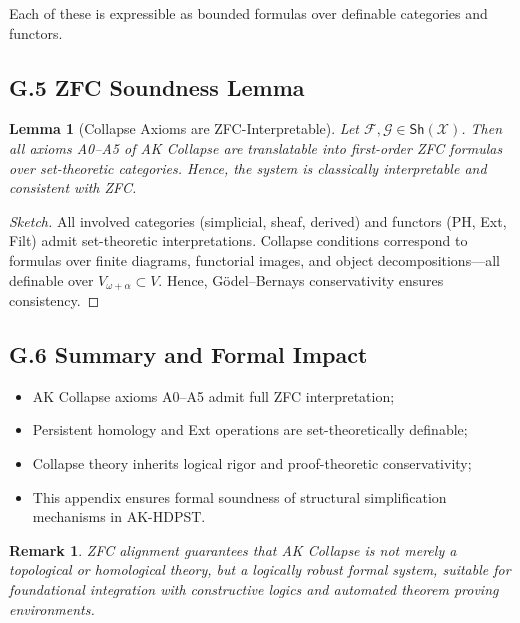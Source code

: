 \documentclass[11pt]{article}
\newtheorem{lemma}[theorem]{Lemma}
\newtheorem{remark}[theorem]{Remark}
\begin{document}
Each of these is expressible as bounded formulas over definable categories and functors.

\subsection*{G.5 ZFC Soundness Lemma}

\begin{lemma}[Collapse Axioms are ZFC-Interpretable]
Let \( \mathcal{F}, \mathcal{G} \in \mathsf{Sh}(\mathcal{X}) \). Then all axioms A0–A5 of AK Collapse  
are translatable into first-order ZFC formulas over set-theoretic categories.  
Hence, the system is classically interpretable and consistent with ZFC.
\end{lemma}

\begin{proof}[Sketch]
All involved categories (simplicial, sheaf, derived) and functors (PH, Ext, Filt) admit set-theoretic interpretations.  
Collapse conditions correspond to formulas over finite diagrams, functorial images, and object decompositions—all  
definable over \( V_{\omega + \alpha} \subset V \). Hence, Gödel–Bernays conservativity ensures consistency.
\end{proof}

\subsection*{G.6 Summary and Formal Impact}

\begin{itemize}
  \item AK Collapse axioms A0–A5 admit full ZFC interpretation;
  \item Persistent homology and Ext operations are set-theoretically definable;
  \item Collapse theory inherits logical rigor and proof-theoretic conservativity;
  \item This appendix ensures formal soundness of structural simplification mechanisms in AK-HDPST.
\end{itemize}

\begin{remark}
ZFC alignment guarantees that AK Collapse is not merely a topological or homological theory,  
but a logically robust formal system, suitable for foundational integration with constructive logics and  
automated theorem proving environments.
\end{remark}
\end{document}
